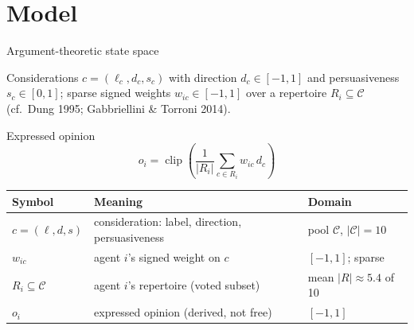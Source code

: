 \documentclass[aspectratio=169,11pt]{beamer}
\begin{document}
\section{Model}

\begin{frame}{Argument-theoretic state space}

Considerations $c = (\ell_c, d_c, s_c)$ with direction $d_c \in [-1,1]$ and persuasiveness $s_c \in [0,1]$; sparse signed weights $w_{ic} \in [-1,1]$ over a repertoire $R_i \subseteq \mathcal{C}$ (cf.\ Dung 1995; Gabbriellini \& Torroni 2014).

\begin{exampleblock}{Expressed opinion}
\[
o_i = \operatorname{clip}\!\left(\frac{1}{|R_i|}\sum_{c \in R_i} w_{ic}\, d_c\right)
\]
\end{exampleblock}

\vspace{0.2cm}
\begin{table}
\centering
\small
\begin{tabular}{lll}
\toprule
\textbf{Symbol} & \textbf{Meaning} & \textbf{Domain} \\
\midrule
$c = (\ell, d, s)$ & consideration: label, direction, persuasiveness & pool $\mathcal{C}$, $|\mathcal{C}|=10$ \\
$w_{ic}$ & agent $i$'s signed weight on $c$ & $[-1, 1]$; sparse \\
$R_i \subseteq \mathcal{C}$ & agent $i$'s repertoire (voted subset) & mean $|R| \approx 5.4$ of 10 \\
$o_i$ & expressed opinion (derived, not free) & $[-1, 1]$ \\
\bottomrule
\end{tabular}
\end{table}

\end{frame}
\end{document}

